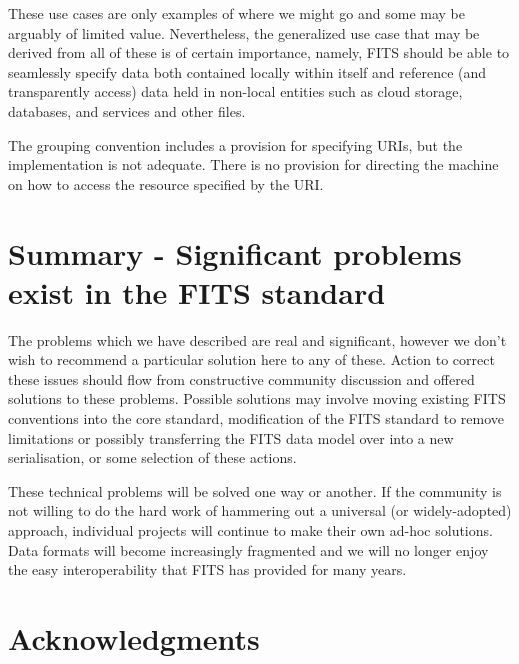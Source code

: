 \documentclass[final,authoryear,5p,times,twocolumn]{elsarticle}
\begin{document}
These use cases are only examples of where we might go and some may be
arguably of limited value. Nevertheless, the generalized use case that
may be derived from all of these is of certain importance, namely,
FITS should be able to seamlessly specify data both contained locally
within itself and reference (and transparently access) data held in
non-local entities such as cloud storage, databases, and services and
other files.


The grouping convention includes a provision for specifying URIs,
but the implementation is not adequate. There is no provision for
directing the machine on how to access the resource specified by the
URI.


\section{Summary - Significant problems exist in the FITS standard}


The problems which we have described are real and significant, however
we don't wish to recommend a particular solution here to any of
these. Action to correct these issues should flow from constructive
community discussion and offered solutions to these problems. Possible
solutions may involve moving existing FITS conventions into the core
standard, modification of the FITS standard to remove limitations or
possibly transferring the FITS data model over into a new
serialisation, or some selection of these actions.


These technical problems will be solved one way or another. If the
community is not willing to do the hard work of hammering out a
universal (or widely-adopted) approach, individual projects will
continue to make their own ad-hoc solutions. Data formats will become
increasingly fragmented and we will no longer enjoy the easy
interoperability that FITS has provided for many years.

\section{Acknowledgments}


\end{document}
